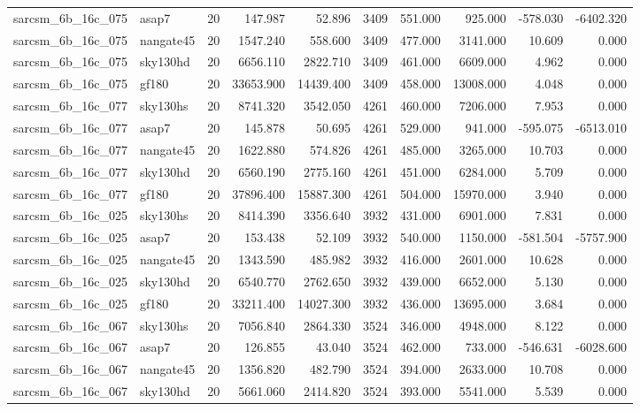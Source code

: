 \begin{tabular}{llrrrrrrrr}
sarcsm\_6b\_16c\_075 & asap7 & 20 & 147.987 & 52.896 & 3409 & 551.000 & 925.000 & -578.030 & -6402.320 \\
sarcsm\_6b\_16c\_075 & nangate45 & 20 & 1547.240 & 558.600 & 3409 & 477.000 & 3141.000 & 10.609 & 0.000 \\
sarcsm\_6b\_16c\_075 & sky130hd & 20 & 6656.110 & 2822.710 & 3409 & 461.000 & 6609.000 & 4.962 & 0.000 \\
sarcsm\_6b\_16c\_075 & gf180 & 20 & 33653.900 & 14439.400 & 3409 & 458.000 & 13008.000 & 4.048 & 0.000 \\
sarcsm\_6b\_16c\_077 & sky130hs & 20 & 8741.320 & 3542.050 & 4261 & 460.000 & 7206.000 & 7.953 & 0.000 \\
sarcsm\_6b\_16c\_077 & asap7 & 20 & 145.878 & 50.695 & 4261 & 529.000 & 941.000 & -595.075 & -6513.010 \\
sarcsm\_6b\_16c\_077 & nangate45 & 20 & 1622.880 & 574.826 & 4261 & 485.000 & 3265.000 & 10.703 & 0.000 \\
sarcsm\_6b\_16c\_077 & sky130hd & 20 & 6560.190 & 2775.160 & 4261 & 451.000 & 6284.000 & 5.709 & 0.000 \\
sarcsm\_6b\_16c\_077 & gf180 & 20 & 37896.400 & 15887.300 & 4261 & 504.000 & 15970.000 & 3.940 & 0.000 \\
sarcsm\_6b\_16c\_025 & sky130hs & 20 & 8414.390 & 3356.640 & 3932 & 431.000 & 6901.000 & 7.831 & 0.000 \\
sarcsm\_6b\_16c\_025 & asap7 & 20 & 153.438 & 52.109 & 3932 & 540.000 & 1150.000 & -581.504 & -5757.900 \\
sarcsm\_6b\_16c\_025 & nangate45 & 20 & 1343.590 & 485.982 & 3932 & 416.000 & 2601.000 & 10.628 & 0.000 \\
sarcsm\_6b\_16c\_025 & sky130hd & 20 & 6540.770 & 2762.650 & 3932 & 439.000 & 6652.000 & 5.130 & 0.000 \\
sarcsm\_6b\_16c\_025 & gf180 & 20 & 33211.400 & 14027.300 & 3932 & 436.000 & 13695.000 & 3.684 & 0.000 \\
sarcsm\_6b\_16c\_067 & sky130hs & 20 & 7056.840 & 2864.330 & 3524 & 346.000 & 4948.000 & 8.122 & 0.000 \\
sarcsm\_6b\_16c\_067 & asap7 & 20 & 126.855 & 43.040 & 3524 & 462.000 & 733.000 & -546.631 & -6028.600 \\
sarcsm\_6b\_16c\_067 & nangate45 & 20 & 1356.820 & 482.790 & 3524 & 394.000 & 2633.000 & 10.708 & 0.000 \\
sarcsm\_6b\_16c\_067 & sky130hd & 20 & 5661.060 & 2414.820 & 3524 & 393.000 & 5541.000 & 5.539 & 0.000 \\

\end{tabular}
